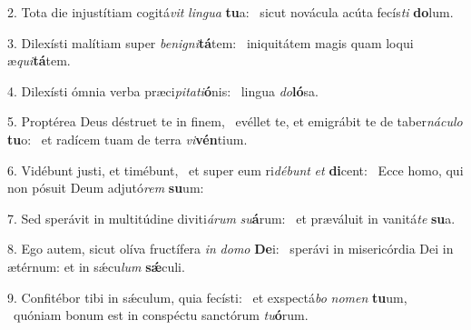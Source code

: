 2. Tota die injustítiam cogitá\textit{vit} \textit{lin}\textit{gua} \textbf{tu}a: \ast\  sicut novácula acúta fecís\textit{ti} \textbf{do}lum.\

3. Dilexísti malítiam super \textit{be}\textit{ni}\textit{gni}\textbf{tá}tem: \ast\  iniquitátem magis quam loqui æ\textit{qui}\textbf{tá}tem.\

4. Dilexísti ómnia verba præci\textit{pi}\textit{ta}\textit{ti}\textbf{ó}nis: \ast\  lingua \textit{do}\textbf{ló}sa.\

5. Proptérea Deus déstruet te in finem, \dag\  evéllet te, et emigrábit te de taber\textit{ná}\textit{cu}\textit{lo} \textbf{tu}o: \ast\  et radícem tuam de terra \textit{vi}\textbf{vén}tium.\

6. Vidébunt justi, et timébunt, \dag\  et super eum ri\textit{dé}\textit{bunt} \textit{et} \textbf{di}cent: \ast\  Ecce homo, qui non pósuit Deum adjutó\textit{rem} \textbf{su}um:\

7. Sed sperávit in multitúdine diviti\textit{á}\textit{rum} \textit{su}\textbf{á}rum: \ast\  et præváluit in vanitá\textit{te} \textbf{su}a.\

8. Ego autem, sicut olíva fructífera \textit{in} \textit{do}\textit{mo} \textbf{De}i: \ast\  sperávi in misericórdia Dei in ætérnum: et in sǽcu\textit{lum} \textbf{sǽ}culi.\

9. Confitébor tibi in sǽculum, quia fecísti: \dag\  et exspectá\textit{bo} \textit{no}\textit{men} \textbf{tu}um, \ast\  quóniam bonum est in conspéctu sanctórum \textit{tu}\textbf{ó}rum.\

